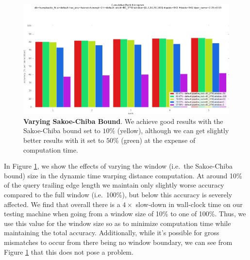 
\begin{figure}[t]%
\centering
\includegraphics[width=1\textwidth]{../images/results/vary_window.png}
\caption{\textbf{Varying Sakoe-Chiba Bound}. We achieve good results with the Sakoe-Chiba bound set to $10\%$ (yellow), although we can get slightly better results with it set to $50\%$ (green) at the expense of computation time.}
\label{fig:vary_window}
\end{figure}



In Figure \ref{fig:vary_window}, we show the effects of varying the window (i.e.\ the Sakoe-Chiba bound) size in the dynamic time warping distance computation.
At around 10\% of the query trailing edge length we maintain only slightly worse accuracy compared to the full window (i.e.\ 100\%), but below this accuracy is severely affected.
We find that overall there is a $4\times$ slow-down in wall-clock time on our testing machine when going from a window size of 10\% to one of 100\%. 
Thus, we use this value for the window size so as to minimize computation time while maintaining the total accuracy.
Additionally, while it's possible for gross mismatches to occur from there being no window boundary, we can see from Figure \ref{fig:vary_window} that this does not pose a problem.


